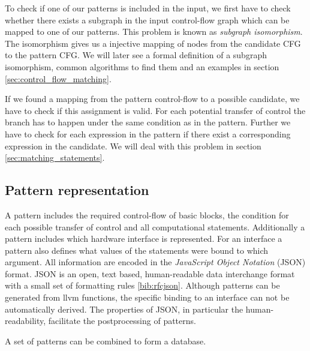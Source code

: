 To check if one of our patterns is included in the input, we first have to check whether there exists a subgraph in the input control-flow graph which can be mapped to one of our patterns. This problem is known as \textit{subgraph isomorphism}. The isomorphism gives us a injective mapping of nodes from the candidate CFG to the pattern CFG. We will later see a formal definition of a subgraph isomorphism, common algorithms to find them and an examples in section \ref{sec:control_flow_matching}.

If we found a mapping from the pattern control-flow to a possible candidate, we have to check if this assignment is valid. For each potential transfer of control the branch has to happen under the same condition as in the pattern. Further we have to check for each expression in the pattern if there exist a corresponding expression in the candidate. We will deal with this problem in section \ref{sec:matching_statements}.

\subsection{Pattern representation}
\label{sec:pattern_representation}
A pattern includes the required control-flow of basic blocks, the condition for each possible transfer of control and all computational statements. Additionally a pattern includes which hardware interface is represented. For an interface a pattern also defines what values  of the statements were bound to which argument. All information are encoded in the \textit{JavaScript Object Notation} (JSON) format. JSON is an open, text based, human-readable data interchange format with a small set of formatting rules \ref{bib:rfcjson}. Although patterns can be generated from llvm functions, the specific binding to an interface can not be automatically derived. The properties of JSON, in particular the human-readability, facilitate the postprocessing of patterns.

A set of patterns can be combined to form a database. %

